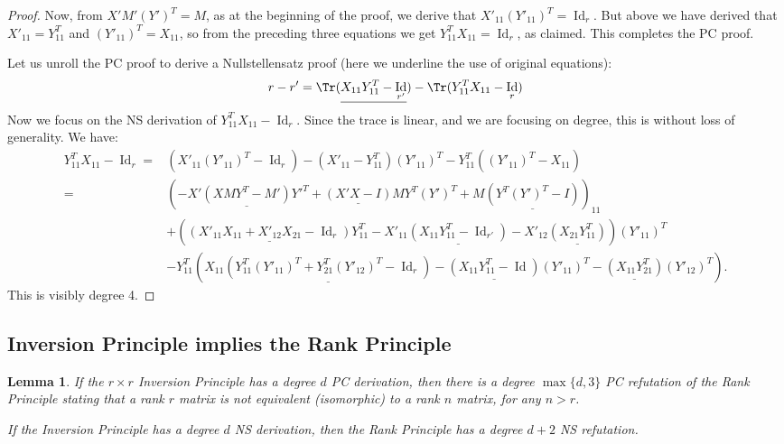 \documentclass[10pt,a4paper]{article}
\newtheorem{lemma}[theorem]{Lemma}
\theoremstyle{definition}
\DeclareMathOperator{\Id}{Id}
\begin{document}
\begin{proof}
Now, from $X' M' (Y')^T = M$, as at the beginning of the proof, we derive that $X'_{11} (Y'_{11})^T = \Id_r$. But above we have derived that $X'_{11} = Y_{11}^T$ and $(Y'_{11})^T = X_{11}$, so from the preceding three equations we get $Y_{11}^T X_{11} = \Id_r$, as claimed. This completes the PC proof.

Let us unroll the PC proof to derive a Nullstellensatz proof (here we underline the use of original equations):
\begin{align*}
r - r' & = \Tr(\underline{X_{11} Y_{11}^T - \Id_{r'}}) - \Tr(Y_{11}^T X_{11} - \Id_r)  \\
\end{align*}
Now we focus on the NS derivation of $Y_{11}^T X_{11} - \Id_r$. Since the trace is linear, and we are focusing on degree, this is without loss of generality. We have:
\begin{align*}
Y_{11}^T X_{11} - \Id_r = & \left(X'_{11} (Y'_{11})^T - \Id_r\right) - (X'_{11} - Y_{11}^T) (Y'_{11})^T -  Y_{11}^T \left((Y'_{11})^T - X_{11}\right) \\
 = & \left(-X' \underline{(XMY^T - M')} Y'^T + \underline{(X'X - I)}MY^T (Y')^T + M \underline{(Y^T (Y')^T - I)}\right)_{11} \\
  & + \left(\underline{(X'_{11} X_{11} + X'_{12} X_{21} - \Id_r)} Y_{11}^T - X'_{11} \underline{(X_{11} Y_{11}^T - \Id_{r'})} - X'_{12}\underline{(X_{21} Y_{11}^T)} \right) (Y'_{11})^T \\ 
  & -  Y_{11}^T \left( X_{11} \underline{(Y_{11}^T (Y'_{11})^T + Y_{21}^T (Y'_{12})^T - \Id_r)} - \underline{(X_{11} Y_{11}^T - \Id)} (Y'_{11})^T - \underline{(X_{11} Y_{21}^T)} (Y'_{12})^T   \right). 
\end{align*}
This is visibly degree 4.
\end{proof}

\subsection{Inversion Principle implies the Rank Principle}

\begin{lemma} \label{lem:inv_to_rank}
If the $r \times r$ Inversion Principle has a degree $d$ PC derivation, 
then there is a degree $\max\{d,3\}$ PC refutation of the Rank Principle stating that a rank $r$ matrix is not equivalent (isomorphic) to a rank $n$ matrix, for any $n > r$. 

If the Inversion Principle has a degree $d$ NS derivation, then the Rank Principle has a degree $d+2$ NS refutation.
\end{lemma}
\end{document}
